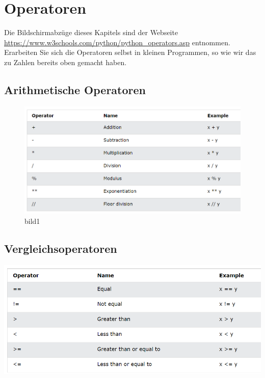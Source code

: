 \documentclass[
  oneside]{book}
\begin{document}
\hypertarget{operatoren}{%
\section{Operatoren}\label{operatoren}}

Die Bildschirmabzüge dieses Kapitels sind der Webseite \url{https://www.w3schools.com/python/python_operators.asp} entnommen. Erarbeiten Sie sich die Operatoren selbst in kleinen Programmen, so wie wir das zu Zahlen bereits oben gemacht haben.

\hypertarget{arithmetische-operatoren}{%
\subsection{Arithmetische Operatoren}\label{arithmetische-operatoren}}

\begin{figure}
\centering
\includegraphics{assets/python.assets/bild1.png}
\caption{bild1}
\end{figure}

\hypertarget{vergleichsoperatoren}{%
\subsection{Vergleichsoperatoren}\label{vergleichsoperatoren}}

\includegraphics{assets/python.assets/image (187).png}
\end{document}
